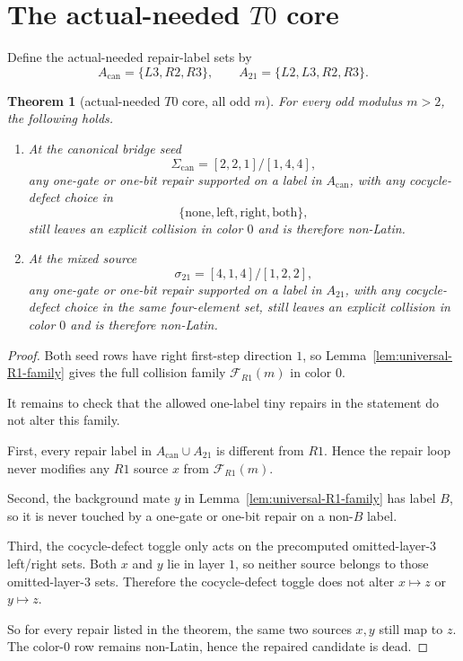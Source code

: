 \documentclass[11pt]{article}
\newtheorem{theorem}{Theorem}
\begin{document}
\section*{The actual-needed $T0$ core}
Define the actual-needed repair-label sets by
\[
A_{\mathrm{can}}=\{L3,R2,R3\},
\qquad
A_{21}=\{L2,L3,R2,R3\}.
\]

\begin{theorem}[actual-needed $T0$ core, all odd $m$]
\label{thm:T0-actual-needed-core}
For every odd modulus $m>2$, the following holds.
\begin{enumerate}
\item At the canonical bridge seed
\[
\Sigma_{\mathrm{can}}=[2,2,1]/[1,4,4],
\]
any one-gate or one-bit repair supported on a label in $A_{\mathrm{can}}$, with any
cocycle-defect choice in
\[
\{\mathrm{none},\mathrm{left},\mathrm{right},\mathrm{both}\},
\]
still leaves an explicit collision in color $0$ and is therefore non-Latin.

\item At the mixed source
\[
\sigma_{21}=[4,1,4]/[1,2,2],
\]
any one-gate or one-bit repair supported on a label in $A_{21}$, with any
cocycle-defect choice in the same four-element set, still leaves an explicit
collision in color $0$ and is therefore non-Latin.
\end{enumerate}
\end{theorem}

\begin{proof}
Both seed rows have right first-step direction $1$, so
Lemma~\ref{lem:universal-R1-family} gives the full collision family
$\mathcal F_{R1}(m)$ in color $0$.

It remains to check that the allowed one-label tiny repairs in the statement do
not alter this family.

First, every repair label in $A_{\mathrm{can}}\cup A_{21}$ is different from $R1$.
Hence the repair loop never modifies any $R1$ source $x$ from
$\mathcal F_{R1}(m)$.

Second, the background mate $y$ in Lemma~\ref{lem:universal-R1-family} has label
$B$, so it is never touched by a one-gate or one-bit repair on a non-$B$ label.

Third, the cocycle-defect toggle only acts on the precomputed omitted-layer-$3$
left/right sets.  Both $x$ and $y$ lie in layer $1$, so neither source belongs to
those omitted-layer-$3$ sets.  Therefore the cocycle-defect toggle does not alter
$x\mapsto z$ or $y\mapsto z$.

So for every repair listed in the theorem, the same two sources $x,y$ still map to
$z$.  The color-$0$ row remains non-Latin, hence the repaired candidate is dead.
\end{proof}
\end{document}
